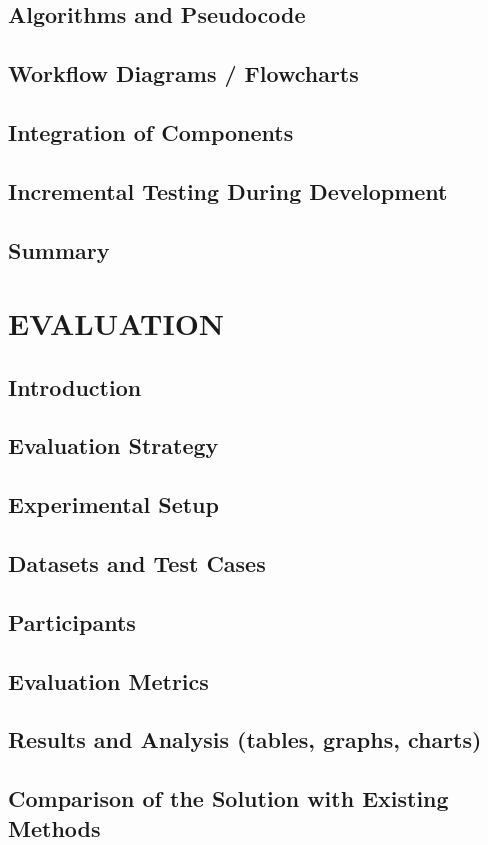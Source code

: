 \documentclass[12pt, a4paper]{report}
\begin{document}
\section{Algorithms and Pseudocode}
\section{Workflow Diagrams / Flowcharts}
\section{Integration of Components}
\section{Incremental Testing During Development}
\section{Summary}

\chapter{EVALUATION}
\section{Introduction}
\section{Evaluation Strategy}
\section{Experimental Setup}
\section{Datasets and Test Cases}
\section{Participants}
\section{Evaluation Metrics}
\section{Results and Analysis (tables, graphs, charts)}
\section{Comparison of the Solution with Existing Methods}
\end{document}
